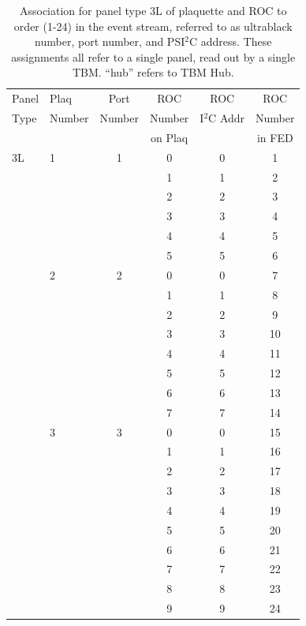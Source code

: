 \documentclass{cmspaper}
\begin{document}
\begin{appendix}
\begin{table}[htb]
    \caption{
Association for panel type 3L of plaquette and ROC to order
(1-24)  in the event stream, referred to as ultrablack number, port number, 
and PSI$^{2}$C address. These assignments all refer to a single panel, read 
out by a single TBM. ``hub'' refers to TBM Hub.
}
    \label{table:plaq_fed_3L}
    \begin{center}
      \begin{tabular}{l|l|cccc} \hline
Panel & Plaq & Port & ROC & ROC & ROC \\
Type  & Number & Number & Number & I$^2$C Addr & Number \\
      &        &        & on Plaq &            & in FED \\ \hline
3L & 1 & 1 &  0 & 0 &  1 \\
   &   &   &  1 & 1 &  2 \\
   &   &   &  2 & 2 &  3 \\
   &   &   &  3 & 3 &  4 \\
   &   &   &  4 & 4 &  5 \\
   &   &   &  5 & 5 &  6 \\
   & 2 & 2 &  0 & 0 &  7 \\
   &   &   &  1 & 1 &  8 \\
   &   &   &  2 & 2 &  9 \\
   &   &   &  3 & 3 & 10 \\
   &   &   &  4 & 4 & 11 \\
   &   &   &  5 & 5 & 12 \\
   &   &   &  6 & 6 & 13 \\
   &   &   &  7 & 7 & 14 \\
   & 3 & 3 &  0 & 0 & 15 \\
   &   &   &  1 & 1 & 16 \\
   &   &   &  2 & 2 & 17 \\
   &   &   &  3 & 3 & 18 \\
   &   &   &  4 & 4 & 19 \\
   &   &   &  5 & 5 & 20 \\
   &   &   &  6 & 6 & 21 \\
   &   &   &  7 & 7 & 22 \\
   &   &   &  8 & 8 & 23 \\
   &   &   &  9 & 9 & 24 \\
      \end{tabular}
    \end{center}
  \end{table}



\end{appendix}
\end{document}
